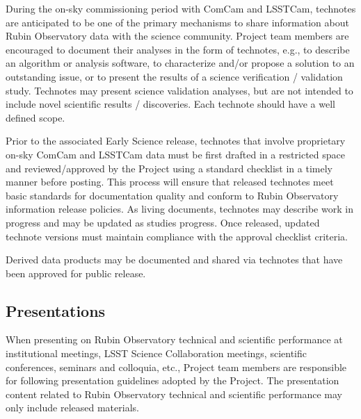 \documentclass[SE,authoryear,toc,lsstdraft]{lsstdoc}
\begin{document}
During the on-sky commissioning period with ComCam and LSSTCam, technotes are anticipated to be one of the primary mechanisms to share information about Rubin Observatory data with the science community.
Project team members are encouraged to document their analyses in the form of technotes, e.g., to describe an algorithm or analysis software, to characterize and/or propose a solution to an outstanding issue, or to present the results of a science verification / validation study.
Technotes may present science validation analyses, but are not intended to include novel scientific results / discoveries.
Each technote should have a well defined scope.

Prior to the associated Early Science release, technotes that involve proprietary on-sky ComCam and LSSTCam data must be first drafted in a restricted space and reviewed/approved by the Project using a standard checklist in a timely manner before posting.
This process will ensure that released technotes meet basic standards for documentation quality and conform to Rubin Observatory information release policies.
As living documents, technotes may describe work in progress and may be updated as studies progress.
Once released, updated technote versions must maintain compliance with the approval checklist criteria.

Derived data products may be documented and shared via technotes that have been approved for public release.


\subsection{Presentations}

When presenting on Rubin Observatory technical and scientific performance at institutional meetings, LSST Science Collaboration meetings, scientific conferences, seminars and colloquia, etc., Project team members are responsible for following presentation guidelines adopted by the Project.
The presentation content related to Rubin Observatory technical and scientific performance may only include released materials.
\end{document}
